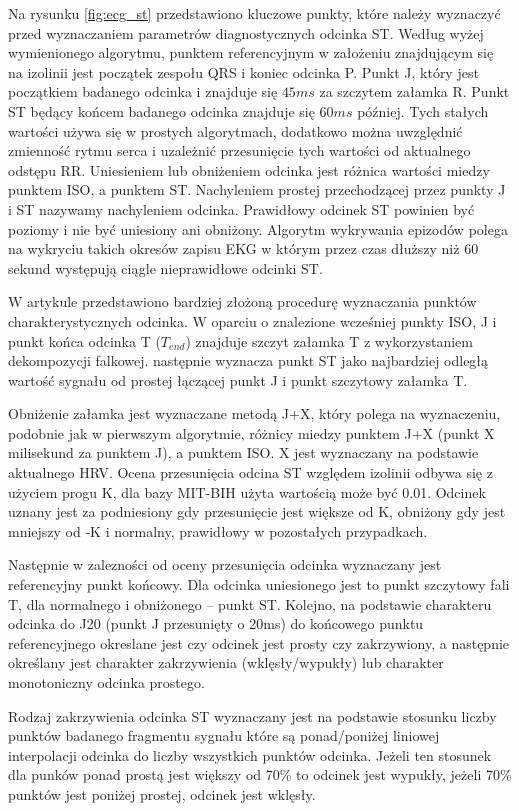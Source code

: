 \documentclass[a4paper, 11pt]{article}
\begin{document}
Na rysunku \ref{fig:ecg_st} przedstawiono kluczowe punkty, które należy
wyznaczyć przed wyznaczaniem parametrów diagnostycznych odcinka ST. Według
wyżej wymienionego algorytmu, punktem referencyjnym w założeniu znajdującym się
na izolinii jest początek zespołu QRS i koniec odcinka P. Punkt J, który jest
początkiem badanego odcinka i znajduje się $45ms$ za szczytem załamka R. Punkt
ST będący końcem badanego odcinka znajduje się $60ms$ później. Tych stałych
wartości używa się w prostych algorytmach, dodatkowo można uwzględnić zmienność
rytmu serca i uzależnić przesunięcie tych wartości od aktualnego odstępu RR.
Uniesieniem lub obniżeniem odcinka jest różnica wartości miedzy punktem ISO, a
punktem ST. Nachyleniem prostej przechodzącej przez punkty J i ST nazywamy
nachyleniem odcinka. Prawidłowy odcinek ST powinien być poziomy i nie być
uniesiony ani obniżony. Algorytm wykrywania epizodów polega na wykryciu takich
okresów zapisu EKG w którym przez czas dłuższy niż 60 sekund występują ciągle
nieprawidłowe odcinki ST.

W artykule \cite{SHEN1} przedstawiono bardziej złożoną procedurę wyznaczania
punktów charakterystycznych odcinka. W oparciu o znalezione wcześniej punkty
ISO, J i punkt końca odcinka T ($T_{end}$) znajduje szczyt załamka T z
wykorzystaniem dekompozycji falkowej. następnie wyznacza punkt ST jako
najbardziej odległą wartość sygnału od prostej łączącej punkt J i punkt
szczytowy załamka T.

Obniżenie załamka jest wyznaczane metodą J+X, który polega na wyznaczeniu,
podobnie jak w pierwszym algorytmie, różnicy miedzy punktem J+X (punkt X
milisekund za punktem J), a punktem ISO. X jest wyznaczany na podstawie
aktualnego HRV. Ocena przesunięcia odcina ST względem izolinii odbywa się z
użyciem progu K, dla bazy MIT-BIH użyta wartością może być 0.01. Odcinek uznany
jest za podniesiony gdy przesunięcie jest większe od K, obniżony gdy jest
mniejszy od -K i normalny, prawidłowy w pozostałych przypadkach.

Następnie w zalezności od oceny przesunięcia odcinka wyznaczany jest
referencyjny punkt końcowy. Dla odcinka uniesionego jest to punkt szczytowy
fali T, dla normalnego i obniżonego -- punkt ST. Kolejno, na podstawie
charakteru odcinka do J20 (punkt J przesunięty o 20ms) do końcowego punktu
referencyjnego okreslane jest czy odcinek jest prosty czy zakrzywiony, a
następnie określany jest charakter zakrzywienia (wklęsły/wypukły) lub charakter
monotoniczny odcinka prostego.

Rodzaj zakrzywienia odcinka ST wyznaczany jest na podstawie stosunku liczby
punktów badanego fragmentu sygnału które są ponad/poniżej liniowej interpolacji
odcinka do liczby wszystkich punktów odcinka. Jeżeli ten stosunek dla punków
ponad prostą jest większy od 70\% to odcinek jest wypukły, jeżeli 70\% punktów
jest poniżej prostej, odcinek jest wklęsły.
\end{document}
